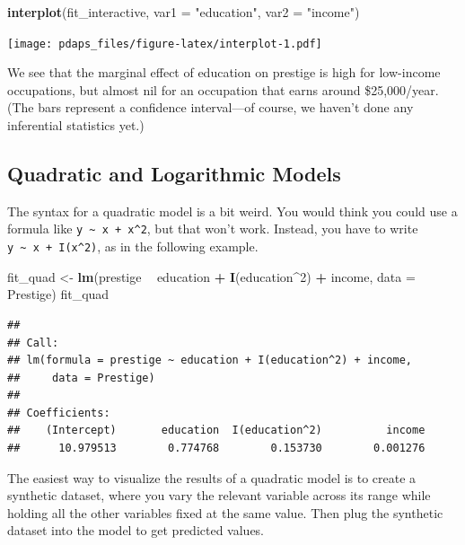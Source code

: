 \documentclass[12pt,oneside,openany]{book}
\newenvironment{Shaded}{\begin{snugshade}}{\end{snugshade}}
\newcommand{\KeywordTok}[1]{\textcolor[rgb]{0.13,0.29,0.53}{\textbf{#1}}}
\newcommand{\DataTypeTok}[1]{\textcolor[rgb]{0.13,0.29,0.53}{#1}}
\newcommand{\DecValTok}[1]{\textcolor[rgb]{0.00,0.00,0.81}{#1}}
\newcommand{\StringTok}[1]{\textcolor[rgb]{0.31,0.60,0.02}{#1}}
\newcommand{\OperatorTok}[1]{\textcolor[rgb]{0.81,0.36,0.00}{\textbf{#1}}}
\newcommand{\NormalTok}[1]{#1}
\begin{document}
\begin{Shaded}
\begin{Highlighting}[]
\KeywordTok{interplot}\NormalTok{(fit_interactive, }\DataTypeTok{var1 =} \StringTok{"education"}\NormalTok{, }\DataTypeTok{var2 =} \StringTok{"income"}\NormalTok{)}
\end{Highlighting}
\end{Shaded}

\texttt{[image: pdaps\_files/figure-latex/interplot-1.pdf]}

We see that the marginal effect of education on prestige is high for
low-income occupations, but almost nil for an occupation that earns
around \$25,000/year. (The bars represent a confidence interval---of
course, we haven't done any inferential statistics yet.)

\subsection{Quadratic and Logarithmic
Models}\label{quadratic-and-logarithmic-models}

The syntax for a quadratic model is a bit weird. You would think you
could use a formula like \texttt{y\ \textasciitilde{}\ x\ +\ x\^{}2},
but that won't work. Instead, you have to write
\texttt{y\ \textasciitilde{}\ x\ +\ I(x\^{}2)}, as in the following
example.

\begin{Shaded}
\begin{Highlighting}[]
\NormalTok{fit_quad <-}\StringTok{ }\KeywordTok{lm}\NormalTok{(prestige }\OperatorTok{~}\StringTok{ }\NormalTok{education }\OperatorTok{+}\StringTok{ }\KeywordTok{I}\NormalTok{(education}\OperatorTok{^}\DecValTok{2}\NormalTok{) }\OperatorTok{+}\StringTok{ }\NormalTok{income, }\DataTypeTok{data =}\NormalTok{ Prestige)}
\NormalTok{fit_quad}
\end{Highlighting}
\end{Shaded}

\begin{verbatim}
## 
## Call:
## lm(formula = prestige ~ education + I(education^2) + income, 
##     data = Prestige)
## 
## Coefficients:
##    (Intercept)       education  I(education^2)          income  
##      10.979513        0.774768        0.153730        0.001276
\end{verbatim}

The easiest way to visualize the results of a quadratic model is to
create a synthetic dataset, where you vary the relevant variable across
its range while holding all the other variables fixed at the same value.
Then plug the synthetic dataset into the model to get predicted values.
\end{document}
